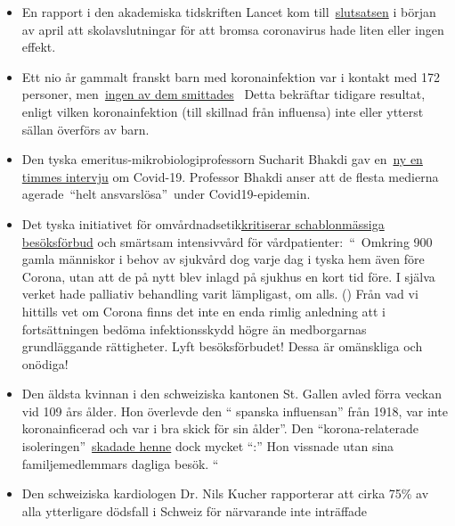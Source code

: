 \begin{itemize}
{  gången på 45 dagar} tidigare denna vecka. Emellertid behandlas igen
  fler människor med andra sjukdomar än sådana med ``Covid19.
\item
  En rapport i den akademiska tidskriften Lancet kom
  till~\href{https://www.thelancet.com/journals/lanchi/article/PIIS2352-4642(20)30095-X/fulltext}{slutsatsen}
  i början av april att skolavslutningar för att bromsa coronavirus hade
  liten eller ingen effekt.
\item
  Ett nio år gammalt franskt barn med koronainfektion var i kontakt med
  172 personer,
  men~\href{https://www.n-tv.de/panorama/172-Kontaktpersonen-von-Corona-verschont-article21727469.html}{ingen
  av dem smittades}~ Detta bekräftar tidigare resultat, enligt vilken
  koronainfektion (till skillnad från influensa) inte eller ytterst
  sällan överförs av barn.
\item
  Den tyska emeritus-mikrobiologiprofessorn Sucharit Bhakdi gav
  en~\href{https://kenfm.de/kenfm-am-set-gespraech-mit-prof-dr-sucharit-bhakdi-zu-covid-19/}{ny
  en timmes intervju} om Covid-19. Professor Bhakdi anser att de flesta
  medierna agerade~``helt ansvarslösa''~under Covid19-epidemin.
\item
  Det tyska initiativet för
  omvårdnadsetik\href{http://pflegeethik-initiative.de/2020/04/15/corona-krise-falsche-prioritaeten-gesetzt-und-ethische-prinzipien-verletzt/}{kritiserar
  schablonmässiga besöksförbud} och smärtsam intensivvård för
  vårdpatienter:~``~Omkring 900 gamla människor i behov av sjukvård dog
  varje dag i tyska hem även före Corona, utan att de på nytt blev
  inlagd på sjukhus en kort tid före. I själva verket hade palliativ
  behandling varit lämpligast, om alls. () Från vad vi hittills vet om
  Corona finns det inte en enda rimlig anledning att i fortsättningen
  bedöma infektionsskydd högre än medborgarnas grundläggande
  rättigheter. Lyft besöksförbudet! Dessa är omänskliga och onödiga!
\item
  Den äldsta kvinnan i den schweiziska kantonen St. Gallen avled förra
  veckan vid 109 års ålder. Hon överlevde den `` spanska influensan''
  från 1918, var inte koronainficerad och var i bra skick för sin
  ålder''. Den ``korona-relaterade
  isoleringen''~\href{https://swprs.files.wordpress.com/2020/04/tagblatt-109.jpg}{skadade
  henne} dock mycket ``:'' Hon vissnade utan sina familjemedlemmars
  dagliga besök. ``
\item
  Den schweiziska kardiologen Dr. Nils Kucher rapporterar att cirka 75\%
  av alla ytterligare dödsfall i Schweiz för närvarande inte inträffade

\end{itemize}

